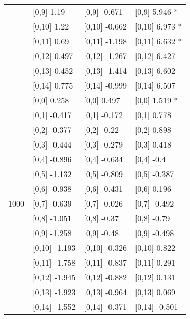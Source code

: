 \begin{table}
\begin{tabular}[t]{llll}
 & {}[0,9] 1.19 & {}[0,9] -0.671 & {}[0,9] 5.946 *\\
\addlinespace
 & {}[0,10] 1.22 & {}[0,10] -0.662 & {}[0,10] 6.973 *\\
 & {}[0,11] 0.69 & {}[0,11] -1.198 & {}[0,11] 6.632 *\\
 & {}[0,12] 0.497 & {}[0,12] -1.267 & {}[0,12] 6.427\\
 & {}[0,13] 0.452 & {}[0,13] -1.414 & {}[0,13] 6.602\\
 & {}[0,14] 0.775 & {}[0,14] -0.999 & {}[0,14] 6.507\\
\addlinespace
 & {}[0,0] 0.258 & {}[0,0] 0.497 & {}[0,0] 1.519 *\\
 & {}[0,1] -0.417 & {}[0,1] -0.172 & {}[0,1] 0.778\\
 & {}[0,2] -0.377 & {}[0,2] -0.22 & {}[0,2] 0.898\\
 & {}[0,3] -0.444 & {}[0,3] -0.279 & {}[0,3] 0.418\\
 & {}[0,4] -0.896 & {}[0,4] -0.634 & {}[0,4] -0.4\\
\addlinespace
 & {}[0,5] -1.132 & {}[0,5] -0.809 & {}[0,5] -0.387\\
 & {}[0,6] -0.938 & {}[0,6] -0.431 & {}[0,6] 0.196\\
1000 & {}[0,7] -0.639 & {}[0,7] -0.026 & {}[0,7] -0.492\\
 & {}[0,8] -1.051 & {}[0,8] -0.37 & {}[0,8] -0.79\\
 & {}[0,9] -1.258 & {}[0,9] -0.48 & {}[0,9] -0.498\\
\addlinespace
 & {}[0,10] -1.193 & {}[0,10] -0.326 & {}[0,10] 0.822\\
 & {}[0,11] -1.758 & {}[0,11] -0.837 & {}[0,11] 0.291\\
 & {}[0,12] -1.945 & {}[0,12] -0.882 & {}[0,12] 0.131\\
 & {}[0,13] -1.923 & {}[0,13] -0.964 & {}[0,13] 0.069\\
 & {}[0,14] -1.552 & {}[0,14] -0.371 & {}[0,14] -0.501\\
\bottomrule
\end{tabular}
\end{table}
